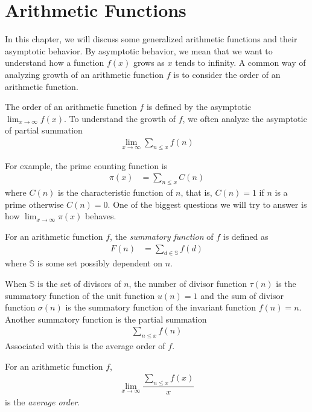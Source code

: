 \documentclass[elemannt.tex]{subfile}
\begin{document}
	\chapter{Arithmetic Functions}\label{ch:arith}
	In this chapter, we will discuss some generalized arithmetic functions and their asymptotic behavior. By asymptotic behavior, we mean that we want to understand how a function $f(x)$ grows as $x$ tends to infinity. A common way of analyzing growth of an arithmetic function $f$ is to consider the order of an arithmetic function.
		\begin{definition}
			The order of an arithmetic function $f$ is defined by the asymptotic $\lim_{x\to\infty}f(x)$. To understand the growth of $f$, we often analyze the asymptotic of partial summation
				\begin{align*}
					\lim\limits_{x\to\infty}\sum_{n\leq x}f(n)
				\end{align*}
		\end{definition}
	For example, the prime counting function is
		\begin{align*}
			\pi(x)
				& = \sum_{n\leq x}C(n)
		\end{align*}
	where $C(n)$ is the characteristic function of $n$, that is, $C(n)=1$ if $n$ is a prime otherwise $C(n)=0$. One of the biggest questions we will try to answer is how $\lim_{x\to\infty}\pi(x)$ behaves.
		\begin{definition}
			For an arithmetic function $f$, the \textit{summatory function} of $f$ is defined as
				\begin{align*}
					F(n)
						& = \sum_{d\in \mathbb{S}}f(d)
				\end{align*}
			where $\mathbb{S}$ is some set possibly dependent on $n$.
		\end{definition}
	When $\mathbb{S}$ is the set of divisors of $n$, the number of divisor function $\tau(n)$ is the summatory function of the unit function $u(n)=1$ and the sum of divisor function $\sigma(n)$ is the summatory function of the invariant function $f(n)=n$. Another summatory function is the partial summation
		\begin{align*}
			\sum_{n\leq x}f(n)
		\end{align*}
	Associated with this is the average order of $f$.
		\begin{definition}
			 For an arithmetic function $f$,
				\begin{align*}
					\lim\limits_{x\to\infty}\dfrac{\sum_{n\leq x}f(x)}{x}
				\end{align*}
			is the \textit{average order}.
		\end{definition}
\end{document}
